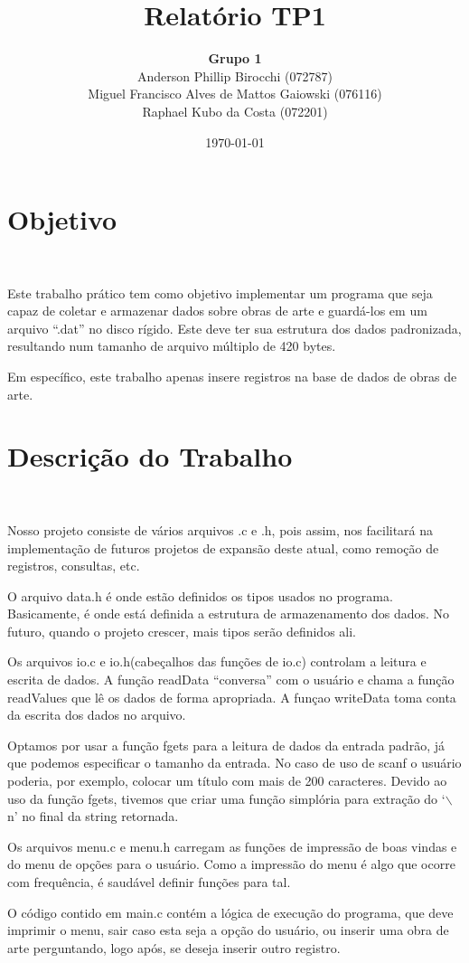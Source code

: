 \documentclass{article}
\title{\textbf{Relatório TP1}}
\author{\textbf{Grupo 1} \\
  Anderson Phillip Birocchi (072787) \\
  Miguel Francisco Alves de Mattos Gaiowski (076116) \\
  Raphael Kubo da Costa (072201)}
\date{\today}
\begin{document}
\maketitle

\section*{Objetivo}\

Este trabalho prático tem como objetivo implementar um programa que seja capaz de coletar e armazenar dados sobre obras de arte e guardá-los em um arquivo ``.dat'' no disco rígido. Este deve ter sua estrutura dos dados padronizada, resultando num tamanho de arquivo múltiplo de 420 bytes.

Em específico, este trabalho apenas insere registros na base de dados de obras de arte.

\section*{Descrição do Trabalho}\

Nosso projeto consiste de vários arquivos .c e .h, pois assim, nos facilitará na implementação de futuros projetos de expansão deste atual, como remoção de registros, consultas, etc. 

O arquivo data.h é onde estão definidos os tipos usados no programa. Basicamente, é onde está definida a estrutura de armazenamento dos dados. No futuro, quando o projeto crescer, mais tipos serão definidos ali.

Os arquivos io.c e io.h(cabeçalhos das funções de io.c) controlam a leitura e escrita de dados. A função readData ``conversa'' com o usuário e chama a função readValues que lê os dados de forma apropriada. A funçao writeData toma conta da escrita dos dados no arquivo.

Optamos por usar a função fgets para a leitura de dados da entrada padrão, já que podemos especificar o tamanho da entrada. No caso de uso de scanf o usuário poderia, por exemplo, colocar um título com mais de 200 caracteres. Devido ao uso da função fgets, tivemos que criar uma função simplória para extração do `$\backslash$n' no final da string retornada.

Os arquivos menu.c e menu.h carregam as funções de impressão de boas vindas e do menu de opções para o usuário. Como a impressão do menu é algo que ocorre com frequência, é saudável definir funções para tal.

O código contido em main.c contém a lógica de execução do programa, que deve imprimir o menu, sair caso esta seja a opção do usuário, ou inserir uma obra de arte perguntando, logo após, se deseja inserir outro registro.
\end{document}
